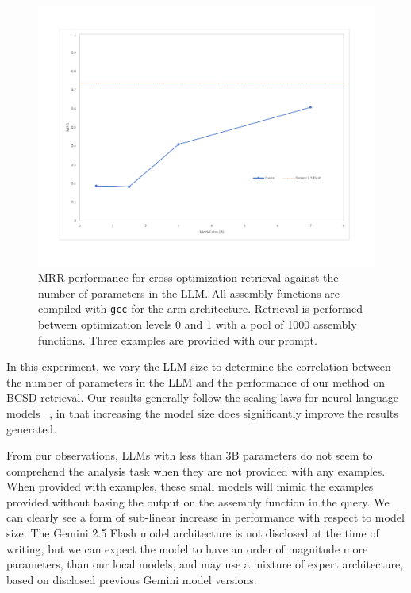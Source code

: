 \documentclass[conference,compsoc]{IEEEtran}
\begin{document}
\begin{figure}[htbp]
\centerline{\includegraphics[width=\linewidth]{size-ablation}}
\caption{MRR performance for cross optimization retrieval against the number of parameters in the LLM. All assembly functions are compiled
with \texttt{gcc} for the arm architecture. Retrieval is performed between optimization levels 0 and 1 with a pool of 1000 assembly functions.
Three examples are provided with our prompt.}
\label{size-abl}
\end{figure}

In this experiment, we vary the LLM size to determine the correlation between the number of parameters in the LLM and the performance
of our method on BCSD retrieval. Our results generally follow the scaling laws for neural language models ~\cite{scaling-laws}, in that increasing
the model size does significantly improve the results generated.

From our observations, LLMs with less than 3B parameters do not seem to comprehend the analysis task when
they are not provided with any examples. When provided with examples, these small models will mimic the examples provided without basing the
output on the assembly function in the query. We can clearly see a form of sub-linear increase in performance with respect to model size.
The Gemini 2.5 Flash model architecture is not disclosed at the time of writing, but we can expect the model to have an order
of magnitude more parameters, than our local models, and may use a mixture of expert architecture, based on disclosed previous Gemini model versions.
\end{document}
